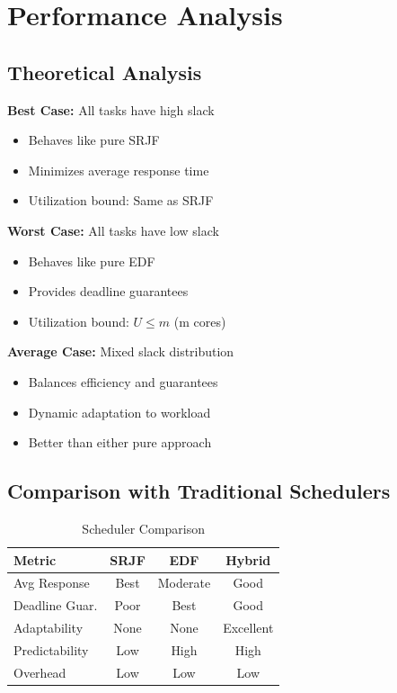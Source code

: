 \documentclass[conference]{IEEEtran}
\begin{document}
\section{Performance Analysis}

\subsection{Theoretical Analysis}

\textbf{Best Case:} All tasks have high slack
\begin{itemize}
    \item Behaves like pure SRJF
    \item Minimizes average response time
    \item Utilization bound: Same as SRJF
\end{itemize}

\textbf{Worst Case:} All tasks have low slack
\begin{itemize}
    \item Behaves like pure EDF
    \item Provides deadline guarantees
    \item Utilization bound: $U \leq m$ (m cores)
\end{itemize}

\textbf{Average Case:} Mixed slack distribution
\begin{itemize}
    \item Balances efficiency and guarantees
    \item Dynamic adaptation to workload
    \item Better than either pure approach
\end{itemize}

\subsection{Comparison with Traditional Schedulers}

\begin{table}[h]
\centering
\caption{Scheduler Comparison}
\begin{tabular}{|l|c|c|c|}
\hline
\textbf{Metric} & \textbf{SRJF} & \textbf{EDF} & \textbf{Hybrid} \\
\hline
Avg Response & Best & Moderate & Good \\
Deadline Guar. & Poor & Best & Good \\
Adaptability & None & None & Excellent \\
Predictability & Low & High & High \\
Overhead & Low & Low & Low \\
\hline
\end{tabular}
\end{table}
\end{document}
